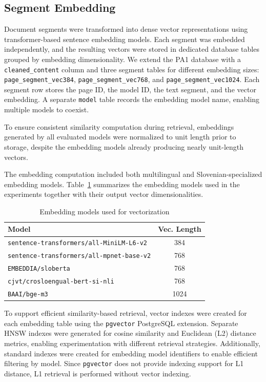 \documentclass[conference]{IEEEtran}
\begin{document}
\subsection{Segment Embedding}

Document segments were transformed into dense vector representations using transformer-based sentence embedding models. Each segment was embedded independently, and the resulting vectors were stored in dedicated database tables grouped by embedding dimensionality. We extend the PA1 database with a \texttt{cleaned\_content} column and three segment tables for different embedding sizes: \texttt{page\_segment\_vec384}, \texttt{page\_segment\_vec768}, and \texttt{page\_segment\_vec1024}. Each segment row stores the page ID, the model ID, the text segment, and the vector embedding. A separate \texttt{model} table records the embedding model name, enabling multiple models to coexist.


To ensure consistent similarity computation during retrieval, embeddings generated by all evaluated models were normalized to unit length prior to storage, despite the embedding models already producing nearly unit-length vectors.

The embedding computation included both multilingual and Slovenian-specialized embedding models. Table~\ref{tab:embedding_models} summarizes the embedding models used in the experiments together with their output vector dimensionalities.

\begin{table}[h]
\centering
\caption{Embedding models used for vectorization}
\label{tab:embedding_models}
\begin{tabular}{|l|c|}
\hline
\textbf{Model} & \textbf{Vec. Length} \\
\hline
\texttt{sentence-transformers/all-MiniLM-L6-v2} & 384 \\
\texttt{sentence-transformers/all-mpnet-base-v2} & 768 \\
\texttt{EMBEDDIA/sloberta} & 768 \\
\texttt{cjvt/crosloengual-bert-si-nli} & 768 \\
\texttt{BAAI/bge-m3} & 1024 \\
\hline
\end{tabular}
\end{table}

To support efficient similarity-based retrieval, vector indexes were created for each embedding table using the \texttt{pgvector} PostgreSQL extension. Separate HNSW indexes were generated for cosine similarity and Euclidean (L2) distance metrics, enabling experimentation with different retrieval strategies. Additionally, standard indexes were created for embedding model identifiers to enable efficient filtering by model. Since \texttt{pgvector} does not provide indexing support for L1 distance, L1 retrieval is performed without vector indexing.
\end{document}
